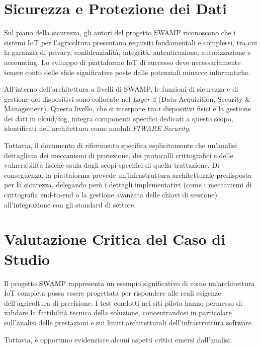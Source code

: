 \section{Sicurezza e Protezione dei Dati}

Sul piano della sicurezza, gli autori del progetto SWAMP riconoscono che i sistemi IoT per l'agricoltura presentano requisiti fondamentali e complessi, tra cui la garanzia di privacy, confidenzialità, integrità, autenticazione, autorizzazione e accounting. Lo sviluppo di piattaforme IoT di successo deve necessariamente tenere conto delle sfide significative poste dalle potenziali minacce informatiche.

All'interno dell'architettura a livelli di SWAMP, le funzioni di sicurezza e di gestione dei dispositivi sono collocate nel \textit{Layer 2} (Data Acquisition, Security \& Management). Questo livello, che si interpone tra i dispositivi fisici e la gestione dei dati in cloud/fog, integra componenti specifici dedicati a questo scopo, identificati nell'architettura come moduli \textit{FIWARE Security}.

Tuttavia, il documento di riferimento specifica esplicitamente che un'analisi dettagliata dei meccanismi di protezione, dei protocolli crittografici e delle vulnerabilità fisiche esula dagli scopi specifici di quella trattazione. Di conseguenza, la piattaforma prevede un'infrastruttura architetturale predisposta per la sicurezza, delegando però i dettagli implementativi (come i meccanismi di crittografia end-to-end o la gestione avanzata delle chiavi di sessione) all'integrazione con gli standard di settore.


\section{Valutazione Critica del Caso di Studio}

Il progetto SWAMP rappresenta un esempio significativo di come un'architettura IoT completa possa essere progettata per rispondere alle reali esigenze dell'agricoltura di precisione. %
I test condotti nei siti pilota hanno permesso di validare la fattibilità tecnica della soluzione, concentrandosi in particolare sull'analisi delle prestazioni e sui limiti architetturali dell'infrastruttura software. %

Tuttavia, è opportuno evidenziare alcuni aspetti critici emersi dall'analisi:

